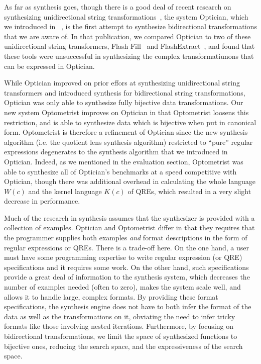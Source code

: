 \documentclass[acmsmall,review,anonymous]{acmart}
\newcommand{\Name}{Optometrist\xspace}
\begin{document}
As far as synthesis goes, though there is a good deal of recent research on
synthesizing unidirectional string
transformations~\cite{singh2012learning,le-pldi-2014,gulwani-popl-2014,perelman2014test,Singh:blinkfill},
the system Optician, which we introduced in ~\cite{optician}, is the first attempt
to synthesize bidirectional transformations that we are aware of. In that
publication, we compared Optician to two of these unidirectional string
transformers, Flash Fill~\cite{gulwani-popl-2014} and
FlashExtract~\cite{le-pldi-2014}, and found that these tools were unsuccessful
in synthesizing the complex transformatiunons that can be expressed in Optician.

While Optician improved on prior effors at synthesizing unidirectional string
transformers and introduced synthesis for bidirectional string transformations,
Optician was only able to synthesize fully bijective data transformations. Our
new system \Name{} improves on Optician in that \Name{} loosens this
restriction, and is able to synthesize data which is bijective when put in
canonical form. \Name{} is therefore a refinement of Optician since the
new synthesis algorithm (i.e. the quotient lens synthesis algorithm) restricted
to ``pure'' regular expressions degenerates to the synthesis algorithm that
we introduced in Optician. Indeed, as we mentioned in the evaluation section,
\Name{} was able to synthesize all of Optician's benchmarks at a speed
competitive with Optician, though there was additional overhead in calculating
the whole language $W(c)$ and the kernel language $K(c)$ of QREs, which
resulted in a very slight decrease in performance.

Much of the research in synthesis assumes that the synthesizer is provided with
a collection of examples. Optician and Optometrist differ in that they requires
that the programmer supplies both examples {\em and} format descriptions in the
form of regular expressions or QREs.  There is a trade-off here.  On the one
hand, a user must have some programming expertise to write regular expression
(or QRE) specifications and it requires some work. On the other hand, such
specifications provide a great deal of information to the synthesis system,
which decreases the number of examples needed (often to zero), makes the system
scale well, and allows it to handle large, complex formats.  By providing these
format specifications, the synthesis engine does not have to both infer the
format of the data as well as the transformations on it, obviating the need to
infer tricky formats like those involving nested iterations. Furthermore, by
focusing on bidirectional transformations, we limit the space of synthesized
functions to bijective ones, reducing the search space, and the expressiveness
of the search space.
\end{document}

